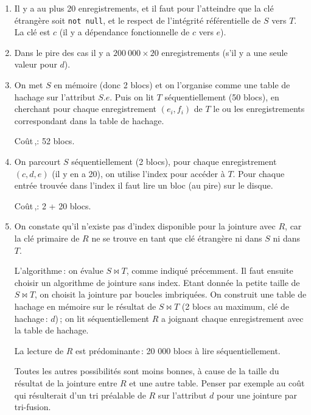 \begin{solution}
 \begin{enumerate}
   \item Il y a au plus 20 enregistrements, et il faut pour l'atteindre
       que la clé étrangère soit \texttt{not null},
       et le respect de l'intégrité référentielle de $S$ vers $T$. La clé
       est $c$ (il y a dépendance fonctionnelle de $c$  vers $e$).

  \item Dans le pire des cas il y a $200~000 \times 20$ enregistrements
        (s'il y a une seule valeur pour $d$).

   \item On met $S$ en mémoire (donc 2 blocs) et on l'organise
   comme une table de hachage sur l'attribut $S.e$. Puis on lit $T$ séquentiellement
   (50 blocs),
   en cherchant pour chaque enregistrement $(e_i,f_i)$ de $T$ le ou les
   enregistrements correspondant dans la table de hachage.
   
   Coût\,,: 52 blocs.
   
   \item On parcourt $S$ séquentiellement (2 blocs), pour chaque enregistrement
   $(c, d,e)$ (il y en a 20), on utilise l'index pour accéder à $T$. Pour chaque entrée
   trouvée dans l'index il faut lire un bloc (au pire) sur le disque.
   
       Coût\,,: 2 + 20 blocs. 

   \item On constate qu'il n'existe pas d'index disponible 
      pour la jointure avec $R$, car la clé primaire de $R$ ne se trouve
      en tant que clé étrangère ni dans $S$ ni dans $T$.
      
      L'algorithme\,: on évalue  $S \Join T$, comme indiqué précemment. 
      Il faut ensuite choisir un algorithme de jointure sans index.
      Etant donnée la petite taille de $S \Join T$, on choisit
     la jointure par boucles imbriquées.
     On construit une table de hachage en mémoire sur le résultat de $S \Join T$
     (2 blocs au maximum, clé de hachage\,: $d$)\,; on lit séquentiellement $R$ 
     a joignant chaque enregistrement avec la table de hachage. 
     
     La lecture de $R$ est prédominante\,: 20 000 blocs à lire séquentiellement.
     
     Toutes les autres possibilités sont moins bonnes, à cause de la taille
     du résultat de la jointure entre $R$ et une autre table. Penser par exemple
     au coût qui résulterait d'un tri préalable de $R$ sur l'attribut $d$ pour
     une jointure par tri-fusion.
     

\end{enumerate}
\end{solution}
